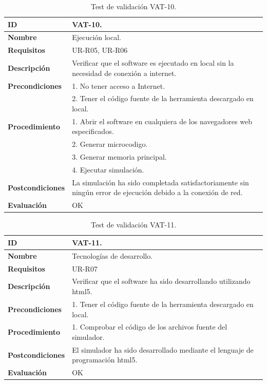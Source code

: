 \begin{center}
\begin{table}[htbp]
\centering
\caption{Test de validación VAT-10.}
\begin{tabular}{@{}p{2.5cm} p{13cm}@{}} 
\toprule
\textbf{ID} 					& VAT-10. \\
\midrule
\textbf{Nombre} 				& Ejecución local. \\
\midrule
\textbf{Requisitos} 		& UR-R05, UR-R06\\
\midrule
\textbf{Descripción} 		& Verificar que el \gls{software} es ejecutado en local sin la necesidad de conexión a internet. \\
\midrule
\textbf{Precondiciones}		& 1. No tener acceso a Internet.\\
											& 2. Tener el código fuente de la herramienta descargado en local.\\
\midrule
\textbf{Procedimiento}			& 1. Abrir el \gls{software} en cualquiera de los navegadores web especificados. \\
							& 2. Generar \gls{microcodigo}.\\
							& 3. Generar memoria principal.\\
							& 4. Ejecutar simulación.\\
\midrule
\textbf{Postcondiciones} 		&  La simulación ha sido completada satisfactoriamente sin ningún error de ejecución debido a la conexión de red.\\
\midrule
\textbf{Evaluación} 			& OK \\
\bottomrule
\end{tabular}
\label{tab:vat-10}
\end{table}
\end{center}

\begin{center}
\begin{table}[htbp]
\centering
\caption{Test de validación VAT-11.}
\begin{tabular}{@{}p{2.5cm} p{13cm}@{}} 
\toprule
\textbf{ID} 					& VAT-11. \\
\midrule
\textbf{Nombre} 				& Tecnologías de desarrollo. \\
\midrule
\textbf{Requisitos} 		& UR-R07\\
\midrule
\textbf{Descripción} 		& Verificar que el \gls{software} ha sido desarrollando utilizando \acrshort{html}5. \\
\midrule
\textbf{Precondiciones}		& 1. Tener el código fuente de la herramienta descargado en local. \\
\midrule
\textbf{Procedimiento}		& 1. Comprobar el código de los archivos fuente del simulador.\\
\midrule
\textbf{Postcondiciones} 		&  El simulador ha sido desarrollado mediante el lenguaje de programación \acrshort{html}5.\\
\midrule
\textbf{Evaluación} 			& OK \\
\bottomrule
\end{tabular}
\label{tab:vat-11}
\end{table}
\end{center}

